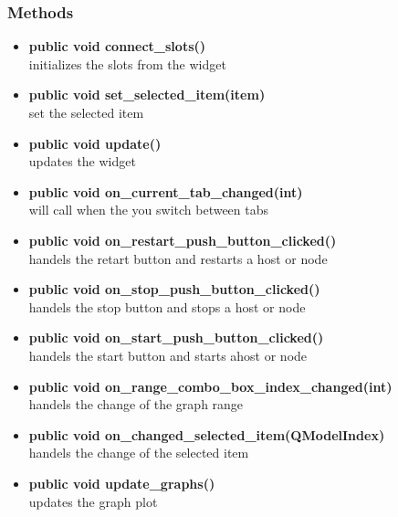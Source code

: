 \subsubsection{Methods}
\begin{itemize}
  \item \textbf{public void connect\_slots()}\\
  initializes the slots from the widget
  \item \textbf{public void set\_selected\_item(item)}\\
  set the selected item
  \item \textbf{public void update()}\\
  updates the widget
  \item \textbf{public void on\_current\_tab\_changed(int)}\\
  will call when the you switch between tabs
  \item \textbf{public void on\_restart\_push\_button\_clicked()}\\
  handels the retart button and restarts a host or node
  \item \textbf{public void on\_stop\_push\_button\_clicked()}\\
  handels the stop button and stops a host or node
  \item \textbf{public void on\_start\_push\_button\_clicked()}\\
  handels the start button and starts ahost or node
  \item \textbf{public void on\_range\_combo\_box\_index\_changed(int)}\\
  handels the change of the graph range
  \item \textbf{public void on\_changed\_selected\_item(QModelIndex)}\\
  handels the change of the selected item
  \item \textbf{public void update\_graphs()}\\
  updates the graph plot
\end{itemize}



